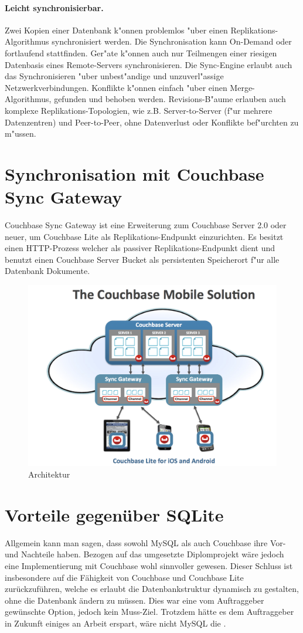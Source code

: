 \documentclass[a4paper,14pt]{scrreprt}
\begin{document}
\paragraph{Leicht synchronisierbar.}
Zwei Kopien einer Datenbank k"onnen problemlos "uber einen Replikations-Algorithmus synchronisiert werden. Die Synchronisation kann On-Demand oder fortlaufend stattfinden. Ger"ate k"onnen auch nur Teilmengen einer riesigen Datenbasis eines Remote-Servers synchronisieren. Die Sync-Engine erlaubt auch das Synchronisieren "uber unbest"andige und unzuverl"assige Netzwerkverbindungen. Konflikte k"onnen einfach "uber einen Merge-Algorithmus, gefunden und behoben werden. Revisions-B"aume erlauben auch komplexe Replikations-Topologien, wie z.B. Server-to-Server (f"ur mehrere Datenzentren) und Peer-to-Peer, ohne Datenverlust oder Konflikte bef"urchten zu m"ussen.
\cite{couch1}
\section{Synchronisation mit Couchbase Sync Gateway}
Couchbase Sync Gateway ist eine Erweiterung zum Couchbase Server 2.0 oder neuer, um Couchbase Lite als Replikations-Endpunkt einzurichten. Es besitzt einen HTTP-Prozess welcher als passiver Replikations-Endpunkt dient und benutzt einen Couchbase Server Bucket als persistenten Speicherort f"ur alle Datenbank Dokumente.\cite{sync1}
\begin{figure}[h!]
\centering
\includegraphics[width=1\linewidth]{./mobile-solution}
\caption[Architektur]{Architektur}
\label{fig:mobile-solution}
\end{figure}
\section{Vorteile gegenüber SQLite}
Allgemein kann man sagen, dass sowohl MySQL als auch Couchbase ihre Vor- und Nachteile haben. Bezogen auf das umgesetzte Diplomprojekt wäre jedoch eine Implementierung mit Couchbase wohl sinnvoller gewesen. Dieser Schluss ist insbesondere auf die Fähigkeit von Couchbase und Couchbase Lite zurückzuführen, welche es erlaubt die Datenbankstruktur dynamisch zu gestalten, ohne die Datenbank ändern zu müssen. Dies war eine vom Auftraggeber gewünschte Option, jedoch kein Muss-Ziel. Trotzdem hätte es dem Auftraggeber in Zukunft einiges an Arbeit erspart, wäre nicht MySQL die .

\end{document}
